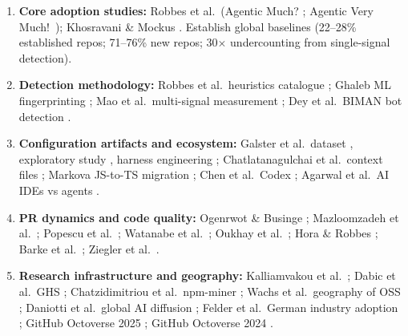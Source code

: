 \documentclass[11pt,a4paper]{article}
\begin{document}
\begin{enumerate}[leftmargin=1.5em, itemsep=4pt]
    \item \textbf{Core adoption studies:} Robbes et al.\ (Agentic Much? \cite{robbes2026agenticmuch};
          Agentic Very Much!\ \cite{robbes2026agenticverymuch}); Khosravani \& Mockus
          \cite{khosravani2026detecting}. Establish global baselines (22--28\% established
          repos; 71--76\% new repos; 30$\times$ undercounting from single-signal detection).

    \item \textbf{Detection methodology:} Robbes et al.\ heuristics catalogue
          \cite{robbes2026promises}; Ghaleb ML fingerprinting \cite{ghaleb2026fingerprinting};
          Mao et al.\ multi-signal measurement \cite{mao2026measurement};
          Dey et al.\ BIMAN bot detection \cite{dey2020biman}.

    \item \textbf{Configuration artifacts and ecosystem:} Galster et al.\ dataset
          \cite{galster2026dataset}, exploratory study \cite{galster2026configuring},
          harness engineering \cite{galster2026harness};
          Chatlatanagulchai et al.\ context files \cite{chatlatanagulchai2025agent};
          Markova JS-to-TS migration \cite{markova2025automation};
          Chen et al.\ Codex \cite{chen2021codex};
          Agarwal et al.\ AI IDEs vs agents \cite{agarwal2026}.

    \item \textbf{PR dynamics and code quality:} Ogenrwot \& Businge \cite{ogenrwot2026how};
          Mazloomzadeh et al.\ \cite{mazloomzadeh2026how};
          Popescu et al.\ \cite{popescu2026investigating};
          Watanabe et al.\ \cite{watanabe2025use};
          Oukhay et al.\ \cite{oukhay2026when};
          Hora \& Robbes \cite{hora2026are};
          Barke et al.\ \cite{barke2023};
          Ziegler et al.\ \cite{ziegler2022}.

    \item \textbf{Research infrastructure and geography:} Kalliamvakou et al.\
          \cite{kalliamvakou2016promises}; Dabic et al.\ GHS \cite{dabic2021sampling};
          Chatzidimitriou et al.\ npm-miner \cite{chatzidimitriou2018};
          Wachs et al.\ geography of OSS \cite{wachs2022geography};
          Daniotti et al.\ global AI diffusion \cite{daniotti2025};
          Felder et al.\ German industry adoption \cite{felder2026};
          GitHub Octoverse 2025 \cite{github2025octoverse};
          GitHub Octoverse 2024 \cite{github2024octoverse}.
\end{enumerate}
\end{document}
